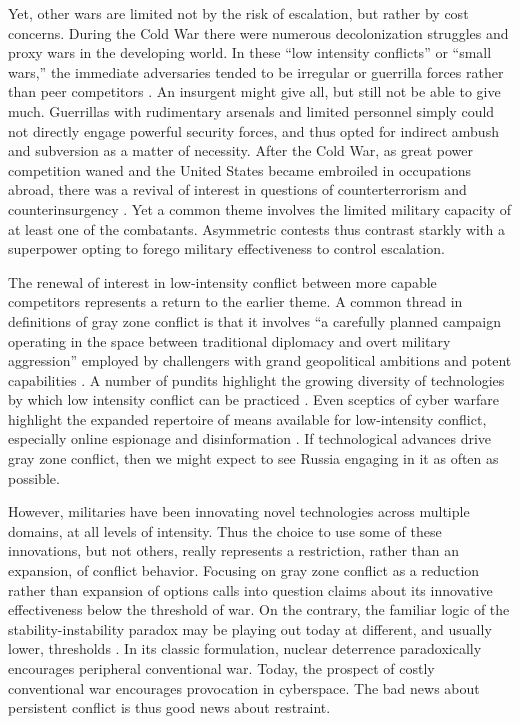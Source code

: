\documentclass[bibtex, autowc]{apsr_submission}
\begin{document}
Yet, other wars are limited not by the risk of escalation, but rather by cost concerns. During the Cold War there were numerous decolonization struggles and proxy wars in the developing world. In these “low intensity conflicts” or “small wars,” the immediate adversaries tended to be irregular or guerrilla forces rather than peer competitors \citep{galula_counterinsurgencywarfaretheory_1964, taber_warfleaclassic_1965, schultz_lowintensitywarfarechallenge_1986}. An insurgent might give all, but still not be able to give much. Guerrillas with rudimentary arsenals and limited personnel simply could not directly engage powerful security forces, and thus opted for indirect ambush and subversion as a matter of necessity. After the Cold War, as great power competition waned and the United States became embroiled in occupations abroad, there was a revival of interest in questions of counterterrorism and counterinsurgency \citep{nagl_learningeatsoup_2005, kilcullen_counterinsurgency_2010}. Yet a common theme involves the limited military capacity of at least one of the combatants. Asymmetric contests thus contrast starkly with a superpower opting to forego military effectiveness to control escalation. 

The renewal of interest in low-intensity conflict between more capable competitors represents a return to the earlier theme. A common thread in definitions of gray zone conflict is that it involves “a carefully planned campaign operating in the space between traditional diplomacy and overt military aggression” employed by challengers with grand geopolitical ambitions and potent capabilities \citep{mazarr_masteringgrayzone_2015}. A number of pundits highlight the growing diversity of technologies by which low intensity conflict can be practiced \citep{wirtz_lifegrayzone_2017}. Even sceptics of cyber warfare highlight the expanded repertoire of means available for low-intensity conflict, especially online espionage and disinformation \citep{rid_cyberwarpeace_2013, jensen_fancybearsdigital_2019}. If technological advances drive gray zone conflict, then we might expect to see Russia engaging in it as often as possible.

However, militaries have been innovating novel technologies across multiple domains, at all levels of intensity. Thus the choice to use some of these innovations, but not others, really represents a restriction, rather than an expansion, of conflict behavior. Focusing on gray zone conflict as a reduction rather than expansion of options calls into question claims about its innovative effectiveness below the threshold of war. On the contrary, the familiar logic of the stability-instability paradox may be playing out today at different, and usually lower, thresholds \citep{lindsay_coercioncyberspacestabilityinstability_2018}. In its classic formulation, nuclear deterrence paradoxically encourages peripheral conventional war. Today, the prospect of costly conventional war encourages provocation in cyberspace. The bad news about persistent conflict is thus good news about restraint. 
\end{document}
